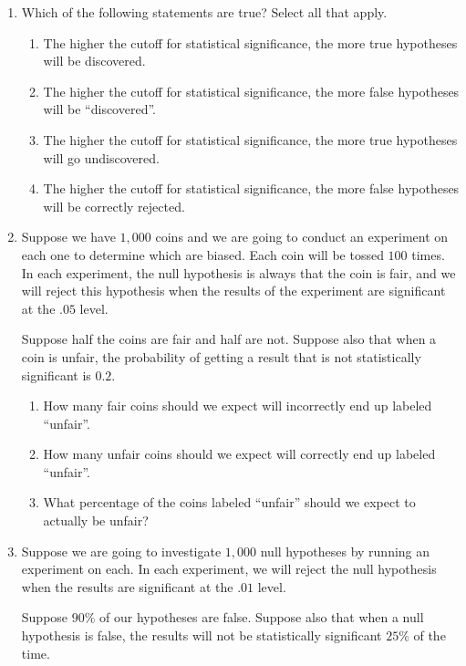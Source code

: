 \documentclass[justified]{tufte-book}
\providecommand{\tightlist}{%
  \setlength{\itemsep}{0pt}\setlength{\parskip}{0pt}}
\theoremstyle{definition}
\theoremstyle{definition}
\theoremstyle{definition}
\theoremstyle{remark}
\begin{document}
\begin{enumerate}
\item
  Which of the following statements are true? Select all that apply.

  \begin{enumerate}
  \def\labelenumii{\alph{enumii}.}
  \tightlist
  \item
    The higher the cutoff for statistical significance, the more true
    hypotheses will be discovered.
  \item
    The higher the cutoff for statistical significance, the more false
    hypotheses will be ``discovered''.
  \item
    The higher the cutoff for statistical significance, the more true
    hypotheses will go undiscovered.
  \item
    The higher the cutoff for statistical significance, the more false
    hypotheses will be correctly rejected.
  \end{enumerate}
\item
  Suppose we have \(1,000\) coins and we are going to conduct an
  experiment on each one to determine which are biased. Each coin will
  be tossed \(100\) times. In each experiment, the null hypothesis is
  always that the coin is fair, and we will reject this hypothesis when
  the results of the experiment are significant at the \(.05\) level.

  Suppose half the coins are fair and half are not. Suppose also that
  when a coin is unfair, the probability of getting a result that is not
  statistically significant is \(0.2\).

  \begin{enumerate}
  \def\labelenumii{\alph{enumii}.}
  \tightlist
  \item
    How many fair coins should we expect will incorrectly end up labeled
    ``unfair''.
  \item
    How many unfair coins should we expect will correctly end up labeled
    ``unfair''.
  \item
    What percentage of the coins labeled ``unfair'' should we expect to
    actually be unfair?
  \end{enumerate}
\item
  Suppose we are going to investigate \(1,000\) null hypotheses by
  running an experiment on each. In each experiment, we will reject the
  null hypothesis when the results are significant at the \(.01\) level.

  Suppose \(90\%\) of our hypotheses are false. Suppose also that when a
  null hypothesis is false, the results will not be statistically
  significant \(25\%\) of the time.


\end{enumerate}
\end{document}

